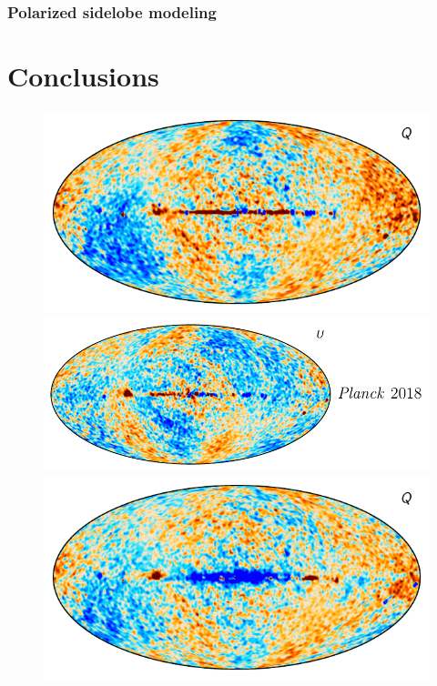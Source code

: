 \documentclass[twocolumn]{../../common/aa}
\begin{document}
\subsubsection{Polarized sidelobe modeling}


\section{Conclusions}
\label{sec:conclusions}

\begin{figure}
	\includegraphics[height=0.15\textheight]{figures/diff_18_DR5_Q.pdf}
	\includegraphics[height=0.15\textheight]{figures/diff_18_DR5_U.pdf}
	\newline
	\includegraphics[height=0.15\textheight]{figures/diff_NPIPE_DR5_Q.pdf}

\end{figure}
\end{document}
